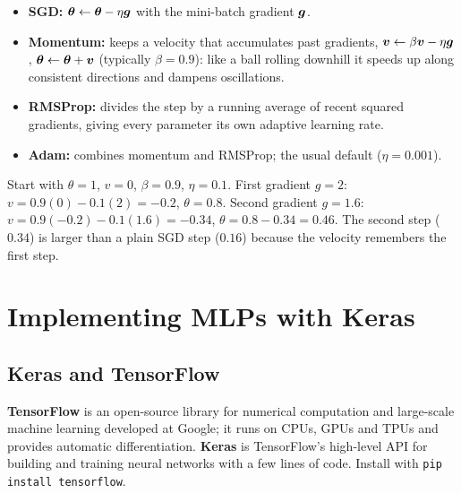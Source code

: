 \begin{definition}
\begin{itemize}
  \item \textbf{SGD:} $\boldsymbol{\theta}\leftarrow\boldsymbol{\theta}-\eta\boldsymbol{g}$ with the mini-batch gradient $\boldsymbol{g}$.
  \item \textbf{Momentum:} keeps a velocity that accumulates past gradients, $\boldsymbol{v}\leftarrow\beta\boldsymbol{v}-\eta\boldsymbol{g}$, $\boldsymbol{\theta}\leftarrow\boldsymbol{\theta}+\boldsymbol{v}$ (typically $\beta=0.9$): like a ball rolling downhill it speeds up along consistent directions and dampens oscillations.
  \item \textbf{RMSProp:} divides the step by a running average of recent squared gradients, giving every parameter its own adaptive learning rate.
  \item \textbf{Adam:} combines momentum and RMSProp; the usual default ($\eta=0.001$).
\end{itemize}
\end{definition}

\begin{example}
Start with $\theta=1$, $v=0$, $\beta=0.9$, $\eta=0.1$. First gradient $g=2$: $v=0.9(0)-0.1(2)=-0.2$, $\theta=0.8$. Second gradient $g=1.6$: $v=0.9(-0.2)-0.1(1.6)=-0.34$, $\theta=0.8-0.34=0.46$. The second step ($0.34$) is larger than a plain SGD step ($0.16$) because the velocity remembers the first step.
\end{example}

\section{Implementing MLPs with Keras}

\subsection{Keras and TensorFlow}

\begin{definition}
\textbf{TensorFlow} is an open-source library for numerical computation and large-scale machine learning developed at Google; it runs on CPUs, GPUs and TPUs and provides automatic differentiation. \textbf{Keras} is TensorFlow's high-level API for building and training neural networks with a few lines of code. Install with \texttt{pip install tensorflow}.
\end{definition}

